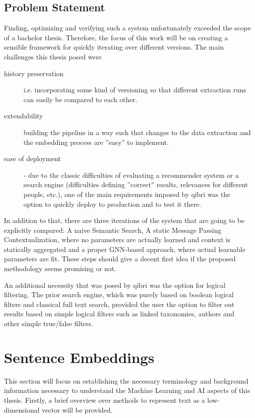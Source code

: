\documentclass[draft,final]{vutinfth} %
\begin{document}
\section{Problem Statement}
Finding, optimizing and verifying such a system unfortunately exceeded the scope of a bachelor thesis. Therefore, the focus of this work will be on creating a sensible framework for quickly iterating over different versions. The main challenges this thesis posed were
\begin{description}
    \item[history preservation] i.e. incorporating some kind of versioning so that different extraction runs can easily be compared to each other.
    \item[extendability] building the pipeline in a way such that changes to the data extraction and the embedding process are ''easy'' to implement.
    \item[ease of deployment] - due to the classic difficulties of evaluating a recommender system or a search engine (difficulties defining ''correct'' results, relevances for different people, etc.), one of the main requirements imposed by qibri was the option to quickly deploy to production and to test it there.
\end{description}
In addition to that, there are three iterations of the system that are going to be explicitly compared: A naive Semantic Search, A static Message Passing Contextualization, where no parameters are actually learned and context is statically aggregated and a proper GNN-based approach, where actual learnable parameters are fit. These steps should give a decent first idea if the proposed methodology seems promising or not.

An additional necessity that was posed by qibri was the option for logical filtering. The prior search engine, which was purely based on boolean logical filters and classical full text search, provided the user the option to filter out results based on simple logical filters such as linked taxonomies, authors and other simple true/false filters.

\chapter{Sentence Embeddings}
This section will focus on establishing the necessary terminology and background information necessary to understand the Machine Learning and AI aspects of this thesis. Firstly, a brief overview over methods to represent text as a low-dimensional vector will be provided. 
\end{document}
